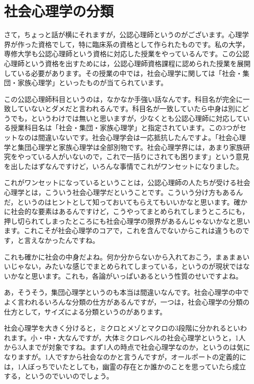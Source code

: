 \documentclass{ltjsbook}
\begin{document}
\section{社会心理学の分類}

さて，ちょっと話が横にそれますが，公認心理師というのがございます。心理学界が作った資格でして，特に臨床系の資格として作られたものです。私の大学，専修大学も公認心理師という資格に対応した授業をやっているんです。この公認心理師という資格を出すためには，公認心理師資格課程に認められた授業を展開している必要があります。その授業の中では，社会心理学に関しては「社会・集団・家族心理学」といったものが当てられています。

この公認心理師科目というのは，なかなか手強い話なんです。科目名が完全に一致していないとダメだと言われるんです。科目名が一致していたら中身は別にどうでも，というわけでは無いと思いますが，少なくとも公認心理師に対応している授業科目名は「社会・集団・家族心理学」と指定されています。この3つがセットなのは間違いないです。社会心理学会は一応抵抗したんですよ。「社会心理学と集団心理学と家族心理学は全部別物です。社会心理学界には，あまり家族研究をやっている人がいないので，これで一括りにされても困ります」という意見を出したはずなんですけど，いろんな事情でこれがワンセットになりました。

これがワンセットになっているということは，公認心理師の人たちが受ける社会心理学とは，こういう社会心理学だということです。こういう分け方もあるんだ，というのはヒントとして知っておいてもらえてもいいかなと思います。確かに社会的な要素はあるんですけど，こうやってまとめられてしまうところにも，押し切られてしまったところにも社会心理学の限界があるんじゃないかなと思います。これこそが社会心理学のコアで，これを含んでないからこれは違うものです，と言えなかったんですね。

これも確かに社会の中身だよね。何か分からないから入れておこう，まぁまぁいいじゃない，みたいな感じでまとめられてしまっている，というのが現状ではないかなと思います。これも，各論がいっぱいあるという性質のせいですよね。

あ，そうそう，集団心理学というのも本当は間違いなんです。社会心理学の中でよく言われるいろんな分類の仕方があるんですが，一つは，社会心理学の分類の仕方として，サイズによる分類というのがあります。

社会心理学を大きく分けると，ミクロとメゾとマクロの3段階に分かれるといわれます。小・中・大なんですが，大体ミクロレベルの社会心理学というと，1人から3人までが対象ですね。まず1人の時点で社会心理学なのか，というのは気になりますが。1人ですから社会なのかと言うんですが，オールポートの定義的には，1人ぼっちでいたとしても，幽霊の存在とか誰かのことを思っていたら成立する，というのでいいのでしょう。
\end{document}
